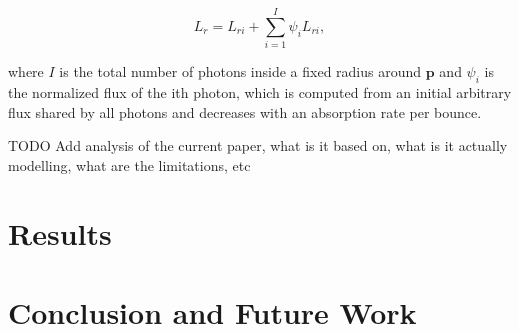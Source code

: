 \documentclass[12pt]{article}
\begin{document}
\begin{equation}
L_r = L_{ri} + \sum_{i = 1}^{I} \psi_i L_{ri},
\end{equation}

where $I$ is the total number of photons inside a fixed radius around $\mathbf{p}$ and $\psi_i$ is the normalized flux of the ith photon, which is computed from an initial arbitrary flux shared by all photons and decreases with an absorption rate per bounce.

TODO Add analysis of the current paper, what is it based on, what is it actually modelling, what are the limitations, etc

\section{Results}

\section{Conclusion and Future Work}



\end{document}
